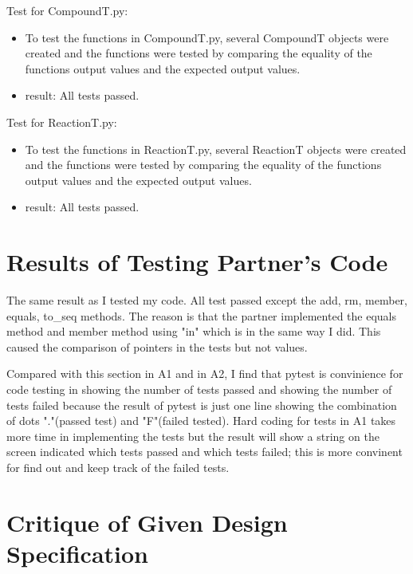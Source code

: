 \documentclass[12pt]{article}
\begin{document}
\smallskip

Test for CompoundT.py:
\begin{itemize}
	\item To test the functions in CompoundT.py, several CompoundT objects were created and the functions were tested by comparing the equality of the functions output values and the expected output values.
	\item result: All tests passed.
\end{itemize}

Test for ReactionT.py:
\begin{itemize}
	\item To test the functions in ReactionT.py, several ReactionT objects were created and the functions were tested by comparing the equality of the functions output values and the expected output values.
	\item result: All tests passed.
\end{itemize}


\section{Results of Testing Partner's Code}

The same result as I tested my code. All test passed except the add, rm, member, equals, to\_seq methods. The reason is that the partner implemented the equals method and member method using "in" which is in the same way I did. This caused the comparison of pointers in the tests but not values.\\

\smallskip

Compared with this section in A1 and in A2, I find that pytest is convinience for code testing in showing the number of tests passed and showing the number of tests failed because the result of pytest is just one line showing the combination of dots "."(passed test) and "F"(failed tested). Hard coding for tests in A1 takes more time in implementing the tests but the result will show a string on the screen indicated which tests passed and which tests failed; this is more convinent for find out and keep track of the failed tests.


\section{Critique of Given Design Specification}
\end{document}
